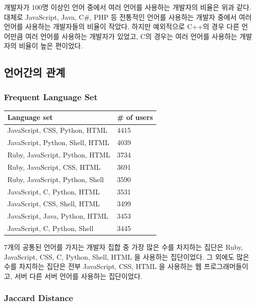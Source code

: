 \documentclass[10pt, a4paper, titlepage]{article}
\begin{document}
개발자가 100명 이상인 언어 중에서 여러 언어를 사용하는 개발자의 비율은 위과 같다. 대체로 JavaScript, Java, C\#, PHP 등 전통적인 언어를 사용하는 개발자 중에서 여러 언어를 사용하는 개발자들의 비율이 작았다. 하지만 예외적으로 C++의 경우 다른 언어만큼 여러 언어를 사용하는 개발자가 있었고, C의 경우는 여러 언어를 사용하는 개발자의 비율이 높은 편이었다.

\subsection{언어간의 관계}

\subsubsection{Frequent Language Set}

\begin{longtable}{|l|l|}
\hline
\rowcolor[gray]{0.8}
Language set & \# of users \\
\hline

JavaScript, CSS, Python, HTML &
4415 \\ \hline
JavaScript, Python, Shell, HTML &
4039 \\ \hline
Ruby, JavaScript, Python, HTML &
3734 \\ \hline
Ruby, JavaScript, CSS, HTML &
3691 \\ \hline
Ruby, JavaScript, Python, Shell &
3590 \\ \hline
JavaScript, C, Python, HTML &
3531 \\ \hline
JavaScript, CSS, Shell, HTML &
3499 \\ \hline
JavaScript, Java, Python, HTML &
3453 \\ \hline
JavaScript, C, Python, Shell &
3445 \\ \hline

\end{longtable}

7개의 공통된 언어를 가지는 개발자 집합 중 가장 많은 수를 차지하는 집단은 Ruby, JavaScript, CSS, C, Python, Shell, HTML 을 사용하는 집단이었다. 그 외에도 많은 수를 차지하는 집단은 전부 JavaScript, CSS, HTML 을 사용하는 웹 프로그래머들이고, 서버 다른 서버 언어를 사용하는 집단이었다.


\subsubsection{Jaccard Distance}
\end{document}
